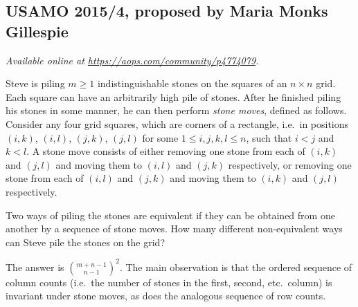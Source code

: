 \documentclass[11pt]{scrartcl}
\begin{document}
\subsection{USAMO 2015/4, proposed by Maria Monks Gillespie}
\textsl{Available online at \url{https://aops.com/community/p4774079}.}
\begin{mdframed}[style=mdpurplebox,frametitle={Problem statement}]
Steve is piling $m\geq 1$ indistinguishable stones
on the squares of an $n\times n$ grid.
Each square can have an arbitrarily high pile of stones.
After he finished piling his stones in some manner,
he can then perform \emph{stone moves}, defined as follows.
Consider any four grid squares, which are corners of a rectangle,
i.e.\ in positions $(i, k)$, $(i, l)$, $(j, k)$, $(j, l)$
for some $1\leq i, j, k, l\leq n$, such that $i<j$ and $k<l$.
A stone move consists of either removing one stone from each of
$(i, k)$ and $(j, l)$ and moving them to $(i, l)$ and $(j, k)$ respectively,
or removing one stone from each of $(i, l)$ and $(j, k)$
and moving them to $(i, k)$ and $(j, l)$ respectively.

Two ways of piling the stones are equivalent if they can be obtained
from one another by a sequence of stone moves.
How many different non-equivalent ways can Steve pile the stones on the grid?
\end{mdframed}
The answer is $\binom{m+n-1}{n-1}^2$.
The main observation is that the ordered sequence of column counts
(i.e.\ the number of stones in the first, second, etc.\ column)
is invariant under stone moves, as does the analogous sequence of row counts.
\end{document}
